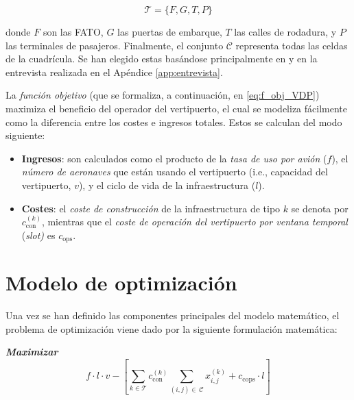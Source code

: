 \documentclass[12pt,a4paper]{book}
\begin{document}
\begin{equation} 
\mathcal{T} = \{F,G,T,P\}
\label{eq:set_T_infraestructuras}
\end{equation}

donde $F$ son las FATO, $G$ las puertas de embarque, $T$ las calles de rodadura, y $P$ las terminales de pasajeros. Finalmente, el conjunto $\mathcal{C}$ representa todas las celdas de la cuadrícula. Se han elegido estas basándose principalmente en \cite{park_vertiport_2022} y en la entrevista realizada en el Apéndice \ref{app:entrevista}. 

La \textsl{función objetivo} (que se formaliza, a continuación, en \ref{eq:f_obj_VDP}) maximiza el beneficio del operador del vertipuerto, el cual se modeliza fácilmente como la diferencia entre los costes e ingresos totales. Estos se calculan del modo siguiente: 
\begin{itemize}
	\item \textbf{Ingresos}: son calculados como el producto de la \textsl{tasa de uso por avión} ($f$), el \textsl{número de aeronaves} que están usando el vertipuerto (i.e., capacidad del vertipuerto, $v$), y el ciclo de vida de la infraestructura ($l$).  
	\item \textbf{Costes}: el \textsl{coste de construcción} de la infraestructura de tipo $k$ se denota por $c_{\text{con}}^{(k)}$, mientras que el \textsl{coste de operación del vertipuerto por ventana temporal} (\textsl{slot)} es $c_{\text{ops}}$. 
\end{itemize} 

\section{Modelo de optimización}\label{Subsec: 2_2}
Una vez se han definido las componentes principales del modelo matemático, el problema de optimización viene dado por la siguiente formulación matemática:  

\textbf{\textsl{Maximizar}} 
\begin{equation} \label{eq:f_obj_VDP}
f\cdot l \cdot v- \left[ \sum_{k \in \mathcal{T}} c_{\text{con}}^{(k)} \sum_{(i,j) \in \, \mathcal{C}} x_{i,j}^{(k)} + c_{\text{cops}} \cdot l  \right]
\end{equation}
\end{document}
